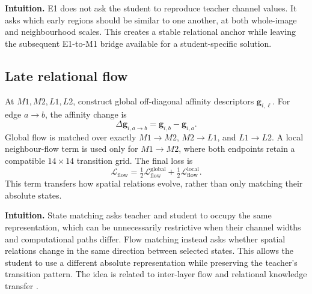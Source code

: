 \textbf{Intuition.} E1 does not ask the student to reproduce teacher channel
values. It asks which early regions should be similar to one another, at both
whole-image and neighbourhood scales. This creates a stable relational anchor
while leaving the subsequent E1-to-M1 bridge available for a student-specific
solution.

\subsection{Late relational flow}

At $M1,M2,L1,L2$, construct global off-diagonal affinity descriptors
$\bm g_{i,\ell}$. For edge $a\rightarrow b$, the affinity change is
\begin{equation}
    \Delta\bm g_{i,a\rightarrow b}
    =\bm g_{i,b}-\bm g_{i,a}.
\end{equation}
Global flow is matched over exactly $M1\rightarrow M2$,
$M2\rightarrow L1$, and $L1\rightarrow L2$. A local neighbour-flow term is
used only for $M1\rightarrow M2$, where both endpoints retain a compatible
$14\times14$ transition grid. The final loss is
\begin{equation}
    \mathcal{L}_{\mathrm{flow}}
    =\tfrac12\mathcal{L}_{\mathrm{flow}}^{\mathrm{global}}
     +\tfrac12\mathcal{L}_{\mathrm{flow}}^{\mathrm{local}}.
\end{equation}
This term transfers how spatial relations evolve, rather than only matching
their absolute states.

\begin{center}
\end{center}

\textbf{Intuition.} State matching asks teacher and student to occupy the same
representation, which can be unnecessarily restrictive when their channel
widths and computational paths differ. Flow matching instead asks whether
spatial relations change in the same direction between selected states. This
allows the student to use a different absolute representation while preserving
the teacher's transition pattern. The idea is related to inter-layer flow and
relational knowledge transfer \cite{yim2017fsp,park2019rkd}.

